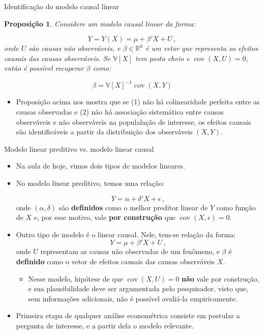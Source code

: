 \documentclass[11pt]{beamer}
\newtheorem{proposition}{Proposição}
\begin{document}
\begin{frame}{Identificação do modelo causal linear}
	\begin{proposition}
		Considere um modelo causal linear da forma:
		
		$$Y =Y(X) = \mu + \beta' X + U\, ,$$
		onde $U$ são causas não observáveis, e $\beta \in \mathbb{R}^k$ é um vetor que representa os efeitos causais das causas observáveis. Se $\mathbb{V}[X]$ tem posto cheio e $\operatorname{cov}(X,U) =0$, então é possível recuperar $\beta$ como:
		
		$$\beta = \mathbb{V}[X]^{-1}\operatorname{cov}(X,Y)$$
	\end{proposition}
	\begin{itemize}
		\item 	Proposição acima nos mostra que se (1) não há colinearidade perfeita entre as causas observadas e (2) não há associação sistemática entre causas observáveis e não observáveis na populalação de interesse, os efeitos causais são {\color{blue}identificáveis} a partir da distribuição dos observáveis $(X,Y)$.
	\end{itemize}

\end{frame}

\begin{frame}{Modelo linear preditivo vs. modelo linear causal}
	\begin{itemize}
		\item Na aula de hoje, vimos dois tipos de modelos lineares.
		\item No modelo linear preditivo, temos uma relação:
		
		$$Y = \alpha + \delta' X + \epsilon\, ,$$
		onde $(\alpha,\delta)$ são \textbf{\color{blue}definidos} como o melhor preditor linear de $Y$ como função de $X$ e, por esse motivo, vale \textbf{\color{blue}por construção}  que $\operatorname{cov}(X,\epsilon) = 0$.
		\item  Outro tipo de modelo é o linear causal. Nele, tem-se relação da forma:
				$$Y = \mu + \beta' X + U\, ,$$
				onde $U$ representam as causas não observadas de um fenômeno, e $\beta$ é {\color{green}\textbf{definido}} como o vetor de efeitos causais das causas observáveis $X$.
				\begin{itemize}
					\item Nesse modelo, hipótese de que $\operatorname{cov}(X,U)=0$ \textbf{\color{red}não} vale por construção, e sua plausibilidade deve ser argumentada pelo pesquisador, visto que, sem informações adicionais, não é possível avaliá-la empiricamente.
				\end{itemize}
		\item Primeira etapa de qualquer análise econométrica consiste em postular a pergunta de interesse, e a partir dela o modelo relevante.
	\end{itemize}
\end{frame}
\end{document}
